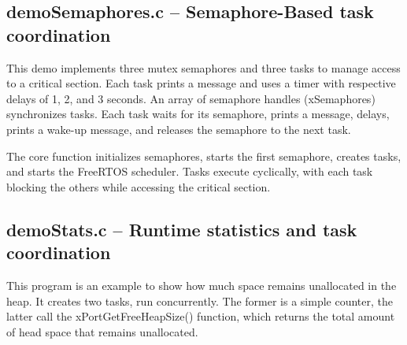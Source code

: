 \documentclass[a4paper, 10pt, oneside]{article} %
\begin{document}
\subsection{demoSemaphores.c --  Semaphore-Based task coordination}

This demo implements three mutex semaphores and three tasks to manage access to a critical section. Each task prints a message and uses a timer with respective delays of 1, 2, and 3 seconds.
An array of semaphore handles (xSemaphores) synchronizes tasks. Each task waits for its semaphore, prints a message, delays, prints a wake-up message, and releases the semaphore to the next task.

The core function initializes semaphores, starts the first semaphore, creates tasks, and starts the FreeRTOS scheduler. Tasks execute cyclically, with each task blocking the others while accessing the critical section.


\begin{comment}
    \begin{lstlisting}[language=C, caption={Task function example}]
void vTask() {
    while(1) {
        if (xSemaphoreTake(xSemaphores[0], portMAX_DELAY) == pdTRUE) {
            printf("After 1 second...\n");
            vTaskDelay(pdMS_TO_TICKS(1000));
            printf("Wake up: semaphore 1\n");
            xSemaphoreGive(xSemaphores[1]);
        }
    }
}

\end{lstlisting}

\begin{lstlisting}[language=C, caption={Semaphore initialization and task creation}]
void demo1() {
    for (int i = 0; i < MAX_TASKS; i++) {
        xSemaphores[i] = xSemaphoreCreateCounting(MAX_COUNT, 0);
        if (xSemaphores[i] == NULL) {
            printf("ERROR: bad semaphore creation.\n");
        }
    }
    xSemaphoreGive(xSemaphores[0]);
    /* Tasks creation and start of FreeRTOS scheduler */

}

\end{lstlisting}
\end{comment}


\subsection{demoStats.c -- Runtime statistics and task coordination}

This program is an example to show how much space remains unallocated in the heap. It creates two tasks, run concurrently. The former is a simple counter, the latter call the xPortGetFreeHeapSize() function, which returns the total amount of head space that remains unallocated.
\end{document}
